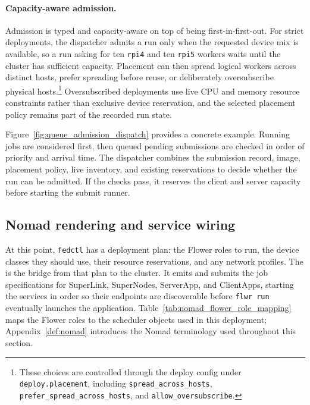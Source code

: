 \paragraph{Capacity-aware admission.}
Admission is typed and capacity-aware on top of being first-in-first-out. For strict deployments, the dispatcher admits a run only when the requested device mix is available, so a run asking for ten \texttt{rpi4} and ten \texttt{rpi5} workers waits until the cluster has sufficient capacity. Placement can then spread logical workers across distinct hosts, prefer spreading before reuse, or deliberately oversubscribe physical hosts.\footnote{These choices are controlled through the deploy config under \texttt{deploy.placement}, including \texttt{spread\_across\_hosts}, \texttt{prefer\_spread\_across\_hosts}, and \texttt{allow\_oversubscribe}.} Oversubscribed deployments use live CPU and memory resource constraints rather than exclusive device reservation, and the selected placement policy remains part of the recorded run state.

Figure~\ref{fig:queue_admission_dispatch} provides a concrete example. Running jobs are considered first, then queued pending submissions are checked in order of priority and arrival time. The dispatcher combines the submission record, image, placement policy, live inventory, and existing reservations to decide whether the run can be admitted. If the checks pass, it reserves the client and server capacity before starting the submit runner.



\FloatBarrier 
\subsection[Nomad rendering and service wiring]{Nomad rendering and service wiring }

At this point, \texttt{fedctl} has a deployment plan: the Flower roles to run, the device classes they should use, their resource reservations, and any network profiles. The  is the bridge from that plan to the cluster. It emits and submits the job specifications for SuperLink, SuperNodes, ServerApp, and ClientApps, starting the services in order so their endpoints are discoverable before \texttt{flwr run} eventually launches the application. Table~\ref{tab:nomad_flower_role_mapping} maps the Flower roles to the scheduler objects used in this deployment; Appendix~\ref{def:nomad} introduces the Nomad terminology used throughout this section.

